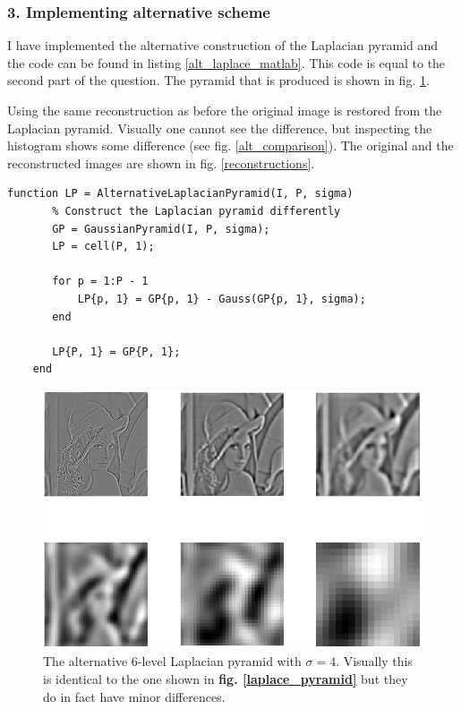 \documentclass[a4paper, 10pt, final]{article}
\begin{document}
\subsubsection*{3. Implementing alternative scheme}

I have implemented the alternative construction of the Laplacian pyramid
and the code can be found in listing \ref{alt_laplace_matlab}. This code
is equal to the second part of the question. The pyramid that is
produced is shown in fig. \ref{alt_laplace_pyramid}.

Using the same reconstruction as before the original image is restored
from the Laplacian pyramid. Visually one cannot see the difference, but
inspecting the histogram shows some difference (see fig.
\ref{alt_comparison}). The original and the reconstructed images are
shown in fig. \ref{reconstructions}.

\begin{lstlisting}[caption={Alternative construction of the Laplacian
    pyramid using difference of two gaussians at different scales.}, captionpos=b,
    label={alt_laplace_matlab}, float=b, numbers=none]
    function LP = AlternativeLaplacianPyramid(I, P, sigma)
       % Construct the Laplacian pyramid differently
       GP = GaussianPyramid(I, P, sigma);
       LP = cell(P, 1);

       for p = 1:P - 1
           LP{p, 1} = GP{p, 1} - Gauss(GP{p, 1}, sigma);
       end
       
       LP{P, 1} = GP{P, 1};
    end
\end{lstlisting}

\begin{figure}[!h]
    \centering
    \includegraphics[angle=0,width=\textwidth]{images/alt_laplace_pyr_6_4}
    \caption{The alternative 6-level Laplacian pyramid with $\sigma =
    4$. Visually this is identical to the one shown in \textbf{fig.
    \ref{laplace_pyramid}} but they do in fact have minor differences.}
    \label{alt_laplace_pyramid}
\end{figure}
\end{document}
